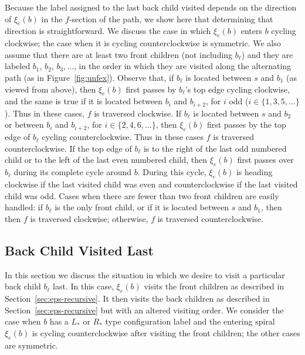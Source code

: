 \documentclass[11pt]{article}
\def\nothing{\ast}
\begin{document}
Because the label assigned to the last back child visited depends
on the direction of $\xi_e(b)$ in the $f$-section of the path, we show here that
determining that direction is straightforward.
We discuss the case in which $\xi_e(b)$ enters $b$
cycling clockwise; the case when it is cycling counterclockwise
is symmetric. We also assume that there are at least two front children
(not including $b_\ell$) and
they are labeled $b_1$, $b_2$, $b_3, \dots$,
in the order in which they are visited along the alternating path (as in Figure~\ref{fig:unfex}).
Observe that, if $b_\ell$ is located between $s$ and $b_1$ (as viewed from above),
then $\xi_e(b)$ first passes by $b_\ell$'s top edge cycling clockwise, and
the same is true if it is located between $b_i$ and $b_{i+2}$,
for $i$ odd ($i \in \{1, 3, 5, \dots\}$). Thus in these cases, $f$ is traversed clockwise.
If $b_\ell$ is located between $s$ and $b_2$ or
between $b_i$ and $b_{i+2}$, for $i \in \{2,4,6,\dots \}$, then
$\xi_e(b)$ first passes by the top edge of $b_\ell$ cycling counterclockwise. Thus
in these cases $f$ is traversed counterclockwise.
If the top edge of $b_\ell$ is to the right of the last  odd
numbered child or to the left of the last even numbered child, then
$\xi_e(b)$ first passes over $b_\ell$ during its complete cycle around $b$.
During this cycle, $\xi_e(b)$ is heading
clockwise  if the last visited child was even and counterclockwise
if the last visited child was odd. Cases when there are fewer than two
front children are easily handled: if $b_\ell$ is the only front child,
or if it is located between $s$ and $b_1$, then then $f$ is traversed clockwise;
otherwise, $f$ is traversed counterclockwise.


\subsection{Back Child Visited Last}
\label{sec:heavyback}

In this section we discuss the situation in which we desire
to visit a particular back child $b_\ell$ last.
In this case, $\xi_e(b)$ visits the front children as described in
Section~\ref{sec:eps-recursive}. It then visits the back children as described
in Section~\ref{sec:eps-recursive} but with an altered visiting order.
We consider the case when $b$ has a $L_{\nothing}$ or $R_{\nothing}$ type configuration
label and the
entering spiral $\xi_e(b)$ is cycling counterclockwise after visiting the front children;
the other cases are symmetric.
\end{document}
